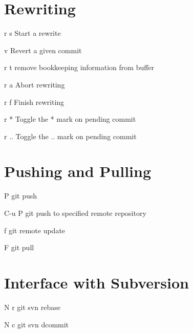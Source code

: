 \documentclass[9pt,a4paper,landscape]{extarticle}
\begin{document}
\begin{multicols}{3}
\section{Rewriting}
\begin{eqlist}
\item[r s] Start a rewrite
\item[v] Revert a given commit
\item[r t] remove bookkeeping information from buffer
\item[r a] Abort rewriting
\item[r f] Finish rewriting
\item[r *] Toggle the * mark on pending commit
\item[r ..] Toggle the .. mark on pending commit
\end{eqlist}

\section{Pushing and Pulling}
\begin{eqlist}
\item[P] git push
\item[C-u P] git push to specified remote repository
\item[f] git remote update
\item[F] git pull
\end{eqlist}

\section{Interface with Subversion}
\begin{eqlist}
\item[N r] git svn rebase
\item[N c] git svn dcommit
\end{eqlist}

\end{multicols}

\let\thefootnote\relax{}
\end{document}
